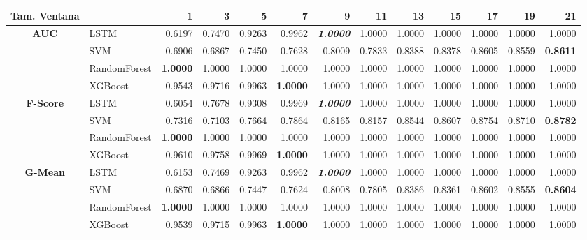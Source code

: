 \begin{table}[H]
	\centering
	\begin{adjustbox}{max width=12cm}
		\begin{tabular}{|c|l|r|r|r|r|r|r|r|r|r|r|r|}
			\hline
			\textbf{Tam. Ventana}&         &      1  &      3  &      5  &      7  &      9  &      11 &      13 &      15 &      17 &      19 &      21 \\
			\hline
			\textbf{AUC} &  LSTM &  0.6197 &  0.7470 &  0.9263 &  0.9962 & \textit{ \textbf{  1.0000 } } &  1.0000 &  1.0000 &  1.0000 &  1.0000 &  1.0000 &  1.0000 \\
			&  SVM &  0.6906 &  0.6867 &  0.7450 &  0.7628 &  0.8009 &  0.7833 &  0.8388 &  0.8378 &  0.8605 &  0.8559 & \textbf{  0.8611 } \\
			&  RandomForest & \textbf{  1.0000 } &  1.0000 &  1.0000 &  1.0000 &  1.0000 &  1.0000 &  1.0000 &  1.0000 &  1.0000 &  1.0000 &  1.0000 \\
			&  XGBoost &  0.9543 &  0.9716 &  0.9963 & \textbf{  1.0000 } &  1.0000 &  1.0000 &  1.0000 &  1.0000 &  1.0000 &  1.0000 &  1.0000 \\
			\hline
			\textbf{F-Score} &  LSTM &  0.6054 &  0.7678 &  0.9308 &  0.9969 & \textit{ \textbf{  1.0000 } } &  1.0000 &  1.0000 &  1.0000 &  1.0000 &  1.0000 &  1.0000 \\
			&  SVM &  0.7316 &  0.7103 &  0.7664 &  0.7864 &  0.8165 &  0.8157 &  0.8544 &  0.8607 &  0.8754 &  0.8710 & \textbf{  0.8782 } \\
			&  RandomForest & \textbf{  1.0000 } &  1.0000 &  1.0000 &  1.0000 &  1.0000 &  1.0000 &  1.0000 &  1.0000 &  1.0000 &  1.0000 &  1.0000 \\
			&  XGBoost &  0.9610 &  0.9758 &  0.9969 & \textbf{  1.0000 } &  1.0000 &  1.0000 &  1.0000 &  1.0000 &  1.0000 &  1.0000 &  1.0000 \\
			\hline
			\textbf{G-Mean} &  LSTM &  0.6153 &  0.7469 &  0.9263 &  0.9962 & \textit{ \textbf{  1.0000 } } &  1.0000 &  1.0000 &  1.0000 &  1.0000 &  1.0000 &  1.0000 \\
			&  SVM &  0.6870 &  0.6866 &  0.7447 &  0.7624 &  0.8008 &  0.7805 &  0.8386 &  0.8361 &  0.8602 &  0.8555 & \textbf{  0.8604 } \\
			&  RandomForest & \textbf{  1.0000 } &  1.0000 &  1.0000 &  1.0000 &  1.0000 &  1.0000 &  1.0000 &  1.0000 &  1.0000 &  1.0000 &  1.0000 \\
			&  XGBoost &  0.9539 &  0.9715 &  0.9963 & \textbf{  1.0000 } &  1.0000 &  1.0000 &  1.0000 &  1.0000 &  1.0000 &  1.0000 &  1.0000 \\

\end{tabular}
\end{adjustbox}
\end{table}
